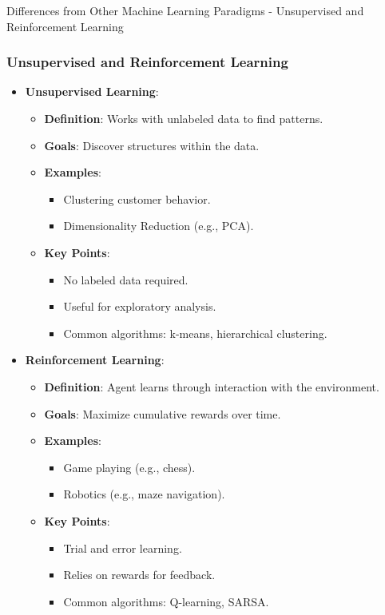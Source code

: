 \documentclass[aspectratio=169]{beamer}
\begin{document}
\begin{frame}[fragile]{Differences from Other Machine Learning Paradigms - Unsupervised and Reinforcement Learning}
    \frametitle{Unsupervised and Reinforcement Learning}
    \begin{itemize}
        \item \textbf{Unsupervised Learning}:
            \begin{itemize}
                \item \textbf{Definition}: Works with unlabeled data to find patterns.
                \item \textbf{Goals}: Discover structures within the data.
                \item \textbf{Examples}:
                    \begin{itemize}
                        \item Clustering customer behavior.
                        \item Dimensionality Reduction (e.g., PCA).
                    \end{itemize}
                \item \textbf{Key Points}:
                    \begin{itemize}
                        \item No labeled data required.
                        \item Useful for exploratory analysis.
                        \item Common algorithms: k-means, hierarchical clustering.
                    \end{itemize}
            \end{itemize}
    
        \item \textbf{Reinforcement Learning}:
            \begin{itemize}
                \item \textbf{Definition}: Agent learns through interaction with the environment.
                \item \textbf{Goals}: Maximize cumulative rewards over time.
                \item \textbf{Examples}:
                    \begin{itemize}
                        \item Game playing (e.g., chess).
                        \item Robotics (e.g., maze navigation).
                    \end{itemize}
                \item \textbf{Key Points}:
                    \begin{itemize}
                        \item Trial and error learning.
                        \item Relies on rewards for feedback.
                        \item Common algorithms: Q-learning, SARSA.
                    \end{itemize}
            \end{itemize}
    \end{itemize}
\end{frame}
\end{document}
